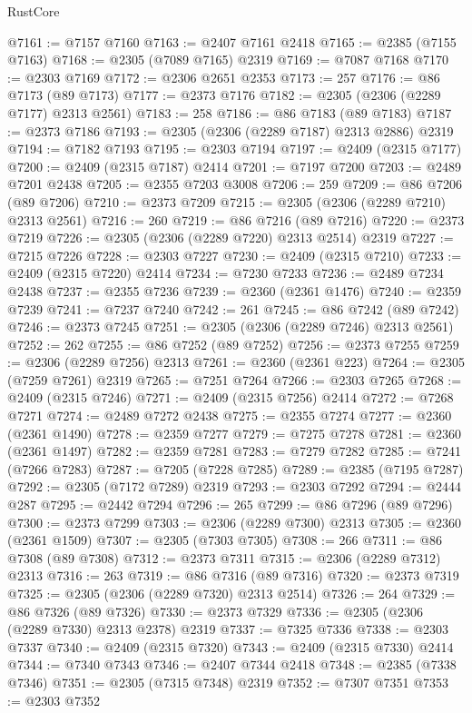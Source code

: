 \begin{lexlean}{RustCore}
\begin{coremodule}
@7161 := @7157 @7160
@7163 := @2407 @7161 @2418
@7165 := @2385 (@7155 @7163)
@7168 := @2305 (@7089 @7165) @2319
@7169 := @7087 @7168
@7170 := @2303 @7169
@7172 := @2306 @2651 @2353
@7173 := 257
@7176 := @86 @7173 (@89 @7173)
@7177 := @2373 @7176
@7182 := @2305 (@2306 (@2289 @7177) @2313 @2561)
@7183 := 258
@7186 := @86 @7183 (@89 @7183)
@7187 := @2373 @7186
@7193 := @2305 (@2306 (@2289 @7187) @2313 @2886) @2319
@7194 := @7182 @7193
@7195 := @2303 @7194
@7197 := @2409 (@2315 @7177)
@7200 := @2409 (@2315 @7187) @2414
@7201 := @7197 @7200
@7203 := @2489 @7201 @2438
@7205 := @2355 @7203 @3008
@7206 := 259
@7209 := @86 @7206 (@89 @7206)
@7210 := @2373 @7209
@7215 := @2305 (@2306 (@2289 @7210) @2313 @2561)
@7216 := 260
@7219 := @86 @7216 (@89 @7216)
@7220 := @2373 @7219
@7226 := @2305 (@2306 (@2289 @7220) @2313 @2514) @2319
@7227 := @7215 @7226
@7228 := @2303 @7227
@7230 := @2409 (@2315 @7210)
@7233 := @2409 (@2315 @7220) @2414
@7234 := @7230 @7233
@7236 := @2489 @7234 @2438
@7237 := @2355 @7236
@7239 := @2360 (@2361 @1476)
@7240 := @2359 @7239
@7241 := @7237 @7240
@7242 := 261
@7245 := @86 @7242 (@89 @7242)
@7246 := @2373 @7245
@7251 := @2305 (@2306 (@2289 @7246) @2313 @2561)
@7252 := 262
@7255 := @86 @7252 (@89 @7252)
@7256 := @2373 @7255
@7259 := @2306 (@2289 @7256) @2313
@7261 := @2360 (@2361 @223)
@7264 := @2305 (@7259 @7261) @2319
@7265 := @7251 @7264
@7266 := @2303 @7265
@7268 := @2409 (@2315 @7246)
@7271 := @2409 (@2315 @7256) @2414
@7272 := @7268 @7271
@7274 := @2489 @7272 @2438
@7275 := @2355 @7274
@7277 := @2360 (@2361 @1490)
@7278 := @2359 @7277
@7279 := @7275 @7278
@7281 := @2360 (@2361 @1497)
@7282 := @2359 @7281
@7283 := @7279 @7282
@7285 := @7241 (@7266 @7283)
@7287 := @7205 (@7228 @7285)
@7289 := @2385 (@7195 @7287)
@7292 := @2305 (@7172 @7289) @2319
@7293 := @2303 @7292
@7294 := @2444 @287
@7295 := @2442 @7294
@7296 := 265
@7299 := @86 @7296 (@89 @7296)
@7300 := @2373 @7299
@7303 := @2306 (@2289 @7300) @2313
@7305 := @2360 (@2361 @1509)
@7307 := @2305 (@7303 @7305)
@7308 := 266
@7311 := @86 @7308 (@89 @7308)
@7312 := @2373 @7311
@7315 := @2306 (@2289 @7312) @2313
@7316 := 263
@7319 := @86 @7316 (@89 @7316)
@7320 := @2373 @7319
@7325 := @2305 (@2306 (@2289 @7320) @2313 @2514)
@7326 := 264
@7329 := @86 @7326 (@89 @7326)
@7330 := @2373 @7329
@7336 := @2305 (@2306 (@2289 @7330) @2313 @2378) @2319
@7337 := @7325 @7336
@7338 := @2303 @7337
@7340 := @2409 (@2315 @7320)
@7343 := @2409 (@2315 @7330) @2414
@7344 := @7340 @7343
@7346 := @2407 @7344 @2418
@7348 := @2385 (@7338 @7346)
@7351 := @2305 (@7315 @7348) @2319
@7352 := @7307 @7351
@7353 := @2303 @7352

\end{coremodule}
\end{lexlean}
